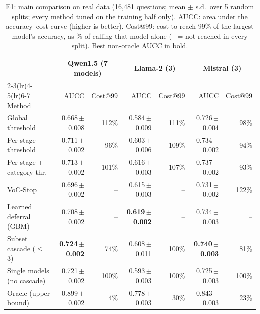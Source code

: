 \begin{table}[t]\centering\small
\caption{E1: main comparison on real data (16{,}481 questions; mean $\pm$ s.d.\ over 5 random splits; every method tuned on the training half only). AUCC: area under the accuracy--cost curve (higher is better). Cost@99: cost to reach 99\% of the largest model's accuracy, as \% of calling that model alone (-- = not reached in every split). Best non-oracle AUCC in bold.}\label{tab:main}
\begin{tabular}{lrrrrrr}\toprule
 & \multicolumn{2}{c}{Qwen1.5 (7 models)} & \multicolumn{2}{c}{Llama-2 (3)} & \multicolumn{2}{c}{Mistral (3)}\\
\cmidrule(lr){2-3}\cmidrule(lr){4-5}\cmidrule(lr){6-7}
Method & AUCC & Cost@99 & AUCC & Cost@99 & AUCC & Cost@99\\\midrule
Global threshold & 0.668\,{\scriptsize$\pm$0.008} & 112\% & 0.584\,{\scriptsize$\pm$0.009} & 111\% & 0.726\,{\scriptsize$\pm$0.004} & 98\%\\
Per-stage threshold & 0.711\,{\scriptsize$\pm$0.002} & 96\% & 0.603\,{\scriptsize$\pm$0.006} & 109\% & 0.734\,{\scriptsize$\pm$0.002} & 94\%\\
Per-stage + category thr. & 0.713\,{\scriptsize$\pm$0.002} & 101\% & 0.616\,{\scriptsize$\pm$0.003} & 107\% & 0.737\,{\scriptsize$\pm$0.002} & 93\%\\
VoC-Stop & 0.696\,{\scriptsize$\pm$0.002} & -- & 0.615\,{\scriptsize$\pm$0.003} & -- & 0.731\,{\scriptsize$\pm$0.002} & 122\%\\
Learned deferral (GBM) & 0.708\,{\scriptsize$\pm$0.002} & -- & \textbf{0.619\,{\scriptsize$\pm$0.002}} & -- & 0.734\,{\scriptsize$\pm$0.003} & --\\
Subset cascade ($\le$3) & \textbf{0.724\,{\scriptsize$\pm$0.002}} & 74\% & 0.608\,{\scriptsize$\pm$0.011} & 100\% & \textbf{0.740\,{\scriptsize$\pm$0.003}} & 81\%\\
Single models (no cascade) & 0.721\,{\scriptsize$\pm$0.002} & 100\% & 0.593\,{\scriptsize$\pm$0.003} & 100\% & 0.725\,{\scriptsize$\pm$0.003} & 100\%\\
\midrule
Oracle (upper bound) & 0.899\,{\scriptsize$\pm$0.002} & 4\% & 0.778\,{\scriptsize$\pm$0.003} & 30\% & 0.843\,{\scriptsize$\pm$0.003} & 23\%\\
\bottomrule\end{tabular}
\end{table}
